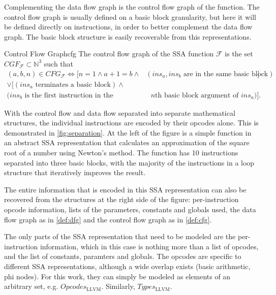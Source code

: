     Complementing the data flow graph is the control flow graph of the function.
    The control flow graph is usually defined on a basic block granularity, but
    here it will be defined directly on instructions, in order to better
    complement the data flow graph.
    The basic block structure is easily recoverable from this representations.

\begin{definition}{Control Flow Graph}{cfg}
    The control flow graph of the SSA function $\mathcal F$ is the set
    $CGF_{\mathcal F}\subset \mathbb N^3$ such that
    \begin{align*}
        (a,b,n)\in CFG_{\mathcal F}\iff[n=1\land a+1=b\land&(ins_a,ins_b\text{ are in the same basic block})] \\
                                   \lor[(ins_a\text{ terminates a basic block})\land&\\
                                        (ins_b\text{ is the first instruction in the}&\text{ $n$th basic block argument of }ins_a)].
    \end{align*}
\end{definition}

    With the control flow and data flow separated into separate mathematical
    structures, the individual instructions are encoded by their opcodes alone.
    This is demonstrated in \autoref{fig:separation}.
    At the left of the figure is a simple function in an abstract SSA
    representation that calculates an approximation of the square root of
    a number using Newton's method.
    The function has 10 instructions separated into three basic blocks, with the
    majority of the instructions in a loop structure that iteratively improves
    the result.

    The entire information that is encoded in this SSA representation can also
    be recovered from the structures at the right side of the figure:
    per-instruction opcode information, lists of the parameters, constants and
    globals used, the data flow graph as in \autoref{def:dfg} and the control
    flow graph as in \autoref{def:cfg}.

    The only parts of the SSA representation that need to be modeled are the
    per-instruction information, which in this case is nothing more than a list
    of opcodes, and the list of constants, paramters and globals.
    The opcodes are specific to different SSA representations, although a wide
    overlap exists (basic arithmetic, phi nodes).
    For this work, they can simply be modeled as elements of an arbitrary set,
    e.g. $Opcodes_\text{LLVM}$.
    Similarly, $Types_\text{LLVM}$.

